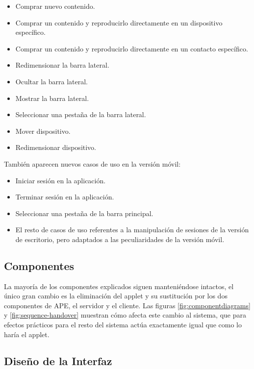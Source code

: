 \begin{itemize}
  \item Comprar nuevo contenido.
  \item Comprar un contenido y reproducirlo directamente en un dispositivo específico.
  \item Comprar un contenido y reproducirlo directamente en un contacto específico.
  \item Redimensionar la barra lateral.
  \item Ocultar la barra lateral.
  \item Mostrar la barra lateral.
  \item Seleccionar una pestaña de la barra lateral.
  \item Mover dispositivo.
  \item Redimensionar dispositivo.
\end{itemize}

También aparecen nuevos casos de uso en la versión móvil:

\begin{itemize}
  \item Iniciar sesión en la aplicación.
  \item Terminar sesión en la aplicación.
  \item Seleccionar una pestaña de la barra principal.
  \item El resto de casos de uso referentes a la manipulación de sesiones de la versión de escritorio, pero adaptados a las peculiaridades de la versión móvil.
\end{itemize}


\subsection{Componentes} %
\label{sub:componentes}

La mayoría de los componentes explicados siguen manteniéndose intactos, el único gran cambio es la eliminación del applet y su sustitución por los dos componentes de APE, el servidor y el cliente.
Las figuras \ref{fig:componentdiagrams} y \ref{fig:sequence-handover} muestran cómo afecta este cambio al sistema, que para efectos prácticos para el resto del sistema actúa exactamente igual que como lo haría el applet.


\subsection{Diseño de la Interfaz} %
\label{sub:diseno_de_la_interfaz}

